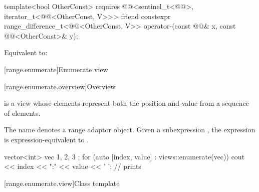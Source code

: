 %
\begin{itemdecl}
template<bool OtherConst>
  requires @@<sentinel_t<@@>, iterator_t<@@<OtherConst, V>>>
friend constexpr range_difference_t<@@<OtherConst, V>>
  operator-(const @@& x, const @@<OtherConst>& y);
\end{itemdecl}

\begin{itemdescr}
\pnum
\effects
Equivalent to: 
\end{itemdescr}

[range.enumerate]{Enumerate view}

[range.enumerate.overview]{Overview}

\pnum
{}%
 is a view whose
elements represent both the position and value from
a sequence of elements.

\pnum
{}%
The name  denotes a range adaptor object.
Given a subexpression ,
the expression  is expression-equivalent to
.
\begin{example}
\begin{codeblock}
vector<int> vec{ 1, 2, 3 };
for (auto [index, value] : views::enumerate(vec))
  cout << index << ":" << value << ' ';         // prints 
\end{codeblock}
\end{example}

[range.enumerate.view]{Class template }

